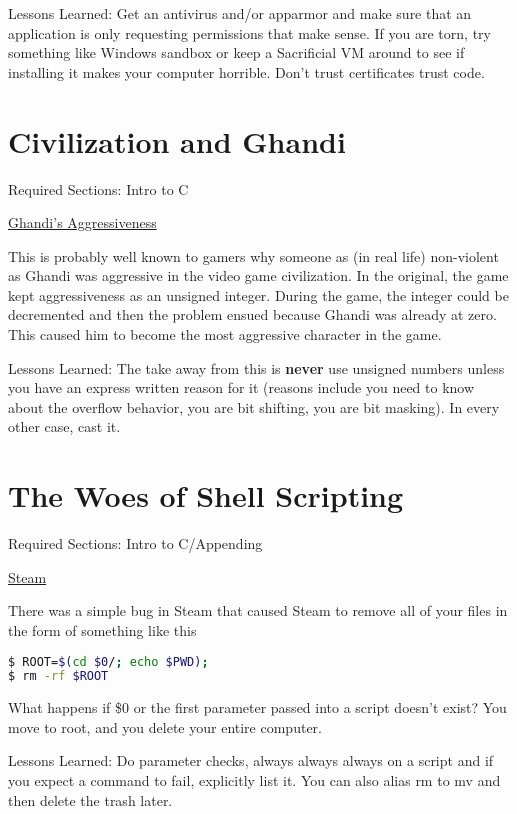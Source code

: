 Lessons Learned: Get an antivirus and/or apparmor and make sure that an application is only requesting permissions that make sense. If you are torn, try something like Windows sandbox or keep a Sacrificial VM around to see if installing it makes your computer horrible. Don't trust certificates trust code.

\section{Civilization and Ghandi}

Required Sections: Intro to C

\href{https://www.geek.com/games/why-gandhi-is-always-a-warmongering-jerk-in-civilization-1608515/}{Ghandi's Aggressiveness}

This is probably well known to gamers why someone as (in real life) non-violent as Ghandi was aggressive in the video game civilization.
In the original, the game kept aggressiveness as an unsigned integer.
During the game, the integer could be decremented and then the problem ensued because Ghandi was already at zero.
This caused him to become the most aggressive character in the game.

Lessons Learned: The take away from this is \textbf{never} use unsigned numbers unless you have an express written reason for it (reasons include you need to know about the overflow behavior, you are bit shifting, you are bit masking).
In every other case, cast it.


\section{The Woes of Shell Scripting}

Required Sections: Intro to C/Appending

\href{https://www.pcworld.com/article/2871653/scary-steam-for-linux-bug-erases-all-the-personal-files-on-your-pc.html}{Steam}

There was a simple bug in Steam that caused Steam to remove all of your files in the form of something like this

\begin{lstlisting}[language=bash]
$ ROOT=$(cd $0/; echo $PWD);
$ rm -rf $ROOT
\end{lstlisting}

What happens if \$0 or the first parameter passed into a script doesn't exist? You move to root, and you delete your entire computer.

Lessons Learned: Do parameter checks, always always always  on a script and if you expect a command to fail, explicitly list it. You can also alias rm to mv and then delete the trash later.

